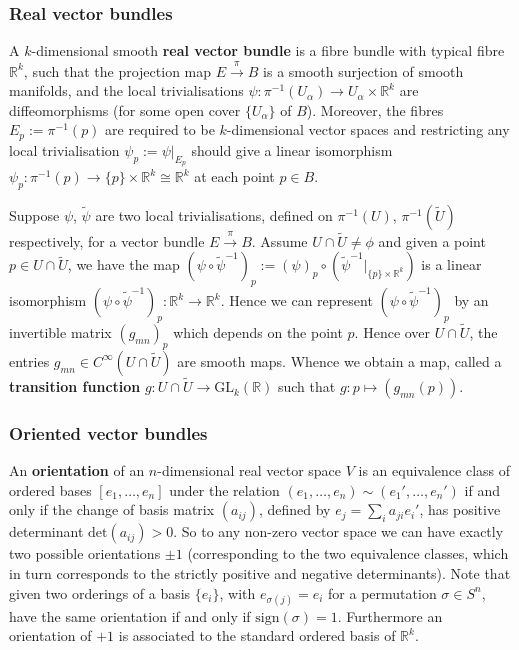 \documentclass[a4paper]{article}
\theoremstyle{definition} \newtheorem*{definition}{Definition}
\theoremstyle{definition} \newtheorem*{definitions}{Definitions}
\theoremstyle{plain} \newtheorem{theorem}{Theorem}[section]
\theoremstyle{plain} \newtheorem{proposition}[theorem]{Proposition}
\theoremstyle{plain} \newtheorem{corollary}[theorem]{Corollary}
\theoremstyle{plain} \newtheorem{lemma}[theorem]{Lemma}
\theoremstyle{plain} \newtheorem{example}[theorem]{Example}
\newcommand{\defn}[1]{\textbf{#1}}
\newcommand{\realnos}{\mathbb{R}}
\newcommand{\canonicaliso}{\cong}
\begin{document}
\subsubsection{Real vector bundles}

A $k$-dimensional smooth \defn{real vector bundle} is a fibre bundle with typical fibre $\realnos^k$, such that the projection map $E\xrightarrow{\pi} B$ is a smooth surjection of smooth manifolds, and the local trivialisations $\psi:\pi^{-1}(U_\alpha) \rightarrow U_\alpha \times \realnos^k$ are diffeomorphisms (for some open cover $\{U_\alpha\}$ of $B$). Moreover, the fibres $E_p:=\pi^{-1}(p)$ are required to be $k$-dimensional vector spaces and restricting any local trivialisation $\psi_p:=\psi \vert_{E_p}$ should give a linear isomorphism $\psi_p:\pi^{-1}(p)\rightarrow \{p\} \times \realnos^k \canonicaliso \realnos^k$ at each point $p\in B$.

Suppose $\psi$, $\tilde{\psi}$ are two local trivialisations, defined on $\pi^{-1}(U)$, $\pi^{-1}(\tilde{U})$ respectively,
for a vector bundle $E\xrightarrow{\pi} B$. Assume $U \cap \tilde{U}\neq \phi$ and given a 
point $p\in U \cap \tilde{U}$, we have the map $(\psi \circ \tilde{\psi}^{-1})_p:=(\psi)_p \circ (\tilde{\psi}^{-1}\vert_{\{p\}\times \realnos^k})$ 
is a linear isomorphism $(\psi \circ \tilde{\psi}^{-1})_p : \realnos^k \rightarrow \realnos^k$. Hence we can represent $(\psi \circ \tilde{\psi}^{-1})_p$ by an invertible matrix $(g_{mn})_p$ which depends on the point $p$. Hence over $U\cap \tilde{U}$, the entries $g_{mn}\in C^\infty(U\cap \tilde{U})$ are smooth maps. Whence we obtain a map, called a \defn{transition function}
$g:U\cap \tilde{U}\rightarrow \mathrm{GL}_k(\realnos)$ such that $g:p\mapsto (g_{mn}(p))$. 

\subsubsection{Oriented vector bundles}

An \defn{orientation} of an $n$-dimensional real vector space $V$ is an equivalence class of ordered bases $[e_1, \ldots, e_n]$ under the relation $(e_1, \ldots, e_n)\sim (e_1', \ldots, e_n')$ if and only if the change of basis matrix $(a_{ij})$, defined by $e_j=\sum_i a_{ji}e_i'$, has positive determinant $\mathrm{det}(a_{ij})>0$. So to any non-zero vector space we can have exactly two possible orientations $\pm 1$ (corresponding to the two equivalence classes, which in turn corresponds to the strictly positive and negative determinants). Note that given two orderings of a basis $\{e_i\}$, with $e_{\sigma(j)}=e_i$ for a permutation $\sigma\in S^n$, have the same orientation if and only if $\mathrm{sign}(\sigma)=1$. Furthermore an orientation of $+1$ is associated to the standard ordered basis of $\realnos^k$.  
\end{document}
